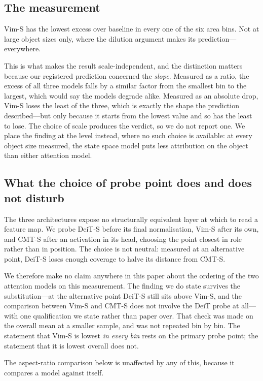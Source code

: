 \subsection{The measurement}

Vim-S has the lowest excess over baseline in every one of the six area bins.
Not at large object sizes only, where the dilution argument makes its
prediction---everywhere.

This is what makes the result scale-independent, and the distinction matters
because our registered prediction concerned the \emph{slope}. Measured as a
ratio, the excess of all three models falls by a similar factor from the
smallest bin to the largest, which would say the models degrade alike.
Measured as an absolute drop, Vim-S loses the least of the three, which is
exactly the shape the prediction described---but only because it starts from
the lowest value and so has the least to lose. The choice of scale produces
the verdict, so we do not report one. We place the finding at the level
instead, where no such choice is available: at every object size measured,
the state space model puts less attribution on the object than either
attention model.

\subsection{What the choice of probe point does and does not disturb}

The three architectures expose no structurally equivalent layer at which to
read a feature map. We probe DeiT-S before its final normalisation, Vim-S
after its own, and CMT-S after an activation in its head, choosing the point
closest in role rather than in position. The choice is not neutral: measured
at an alternative point, DeiT-S loses enough coverage to halve its distance
from CMT-S.

We therefore make no claim anywhere in this paper about the ordering of the
two attention models on this measurement. The finding we do state survives
the substitution---at the alternative point DeiT-S still sits above Vim-S,
and the comparison between Vim-S and CMT-S does not involve the DeiT probe at
all---with one qualification we state rather than paper over. That check was
made on the overall mean at a smaller sample, and was not repeated bin by
bin. The statement that Vim-S is lowest \emph{in every bin} rests on the
primary probe point; the statement that it is lowest overall does not.

The aspect-ratio comparison below is unaffected by any of this, because it
compares a model against itself.

